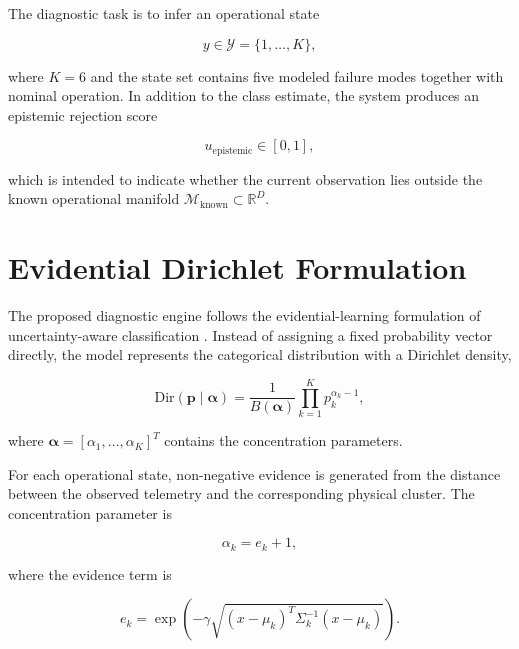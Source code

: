 \documentclass[conference]{IEEEtran}
\begin{document}
The diagnostic task is to infer an operational state

\begin{equation}
y\in\mathcal{Y}=\{1,\ldots,K\},
\end{equation}

where $K=6$ and the state set contains five modeled failure modes together
with nominal operation. In addition to the class estimate, the system
produces an epistemic rejection score

\begin{equation}
u_{\mathrm{epistemic}}\in[0,1],
\end{equation}

which is intended to indicate whether the current observation lies outside
the known operational manifold $\mathcal{M}_{\mathrm{known}}\subset
\mathbb{R}^{D}$.

\section{Evidential Dirichlet Formulation}

The proposed diagnostic engine follows the evidential-learning formulation
of uncertainty-aware classification \cite{sensoy2018,malinin2018}. Instead of
assigning a fixed probability vector directly, the model represents the
categorical distribution with a Dirichlet density,

\begin{equation}
\mathrm{Dir}(\mathbf{p}\mid\boldsymbol{\alpha})
=
\frac{1}{B(\boldsymbol{\alpha})}
\prod_{k=1}^{K}p_k^{\alpha_k-1},
\label{eq:dirichlet}
\end{equation}

where $\boldsymbol{\alpha}=[\alpha_1,\ldots,\alpha_K]^T$ contains the
concentration parameters.

For each operational state, non-negative evidence is generated from the
distance between the observed telemetry and the corresponding physical
cluster. The concentration parameter is

\begin{equation}
\alpha_k=e_k+1,
\label{eq:alpha}
\end{equation}

where the evidence term is

\begin{equation}
e_k
=
\exp\left(
-\gamma
\sqrt{
(x-\mu_k)^T
\Sigma_k^{-1}
(x-\mu_k)
}
\right).
\label{eq:evidence}
\end{equation}
\end{document}
